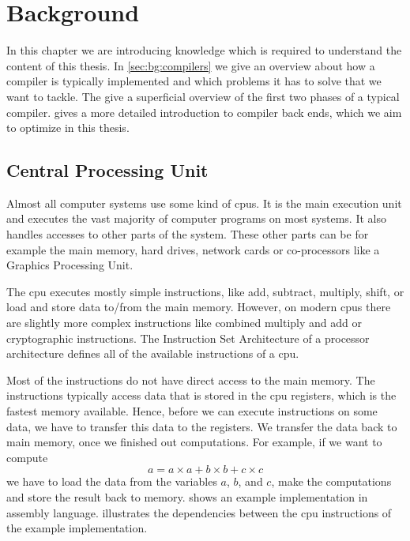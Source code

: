 \chapter{Background}
In this chapter we are introducing knowledge which is required to understand the content of this thesis.
In \cref{sec:bg:compilers} we give an overview about how a compiler is typically implemented and which problems it has to solve that we want to tackle.
The  give a superficial overview of the first two phases of a typical compiler.
 gives a more detailed introduction to compiler back ends, which we aim to optimize in this thesis.


% 

\section{Central Processing Unit}
\label{sec:bg:cpu}
Almost all computer systems use some kind of \acp{cpu}.
It is the main execution unit and executes the vast majority of computer programs on most systems.
It also handles accesses to other parts of the system.
These other parts can be for example the main memory, hard drives, network cards or co-processors like a Graphics Processing Unit.

The \ac{cpu} executes mostly simple instructions, like add, subtract, multiply, shift, or load and store data to/from the main memory.
However, on modern \acp{cpu} there are slightly more complex instructions like combined multiply and add or cryptographic instructions.
The Instruction Set Architecture of a processor architecture defines all of the available instructions of a \ac{cpu}.

Most of the instructions do not have direct access to the main memory.
The instructions typically access data that is stored in the \ac{cpu} registers, which is the fastest memory available.
Hence, before we can execute instructions on some data, we have to transfer this data to the registers.
We transfer the data back to main memory, once we finished out computations.
For example, if we want to compute 
\begin{equation}
    a=a\times a+b\times b+c\times c
    \label{eqn:bg:abc}
\end{equation}
we have to load the data from the variables $a$, $b$, and $c$, make the computations and store the result back to memory.
 shows an example implementation in assembly language.
 illustrates the dependencies between the \ac{cpu} instructions of the example implementation.

